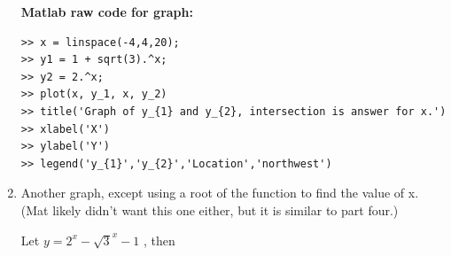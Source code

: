 \documentclass[12pt]{article}
\begin{document}
\begin{enumerate}[label=\textbf{\arabic*}.]
\begin{minipage}{.3\linewidth}
\end{minipage}

\textbf{Matlab raw code for graph:}
\begin{verbatim}
>> x = linspace(-4,4,20);
>> y1 = 1 + sqrt(3).^x;
>> y2 = 2.^x;
>> plot(x, y_1, x, y_2)
>> title('Graph of y_{1} and y_{2}, intersection is answer for x.')
>> xlabel('X')
>> ylabel('Y')
>> legend('y_{1}','y_{2}','Location','northwest')
\end{verbatim}


\newpage

\item Another graph, except using a root of the function to find the value of x. (Mat likely didn't want this one either, but it is similar to part four.)

Let $y = 2^{x} - \sqrt{3}^x - 1$ , then 


\end{enumerate}
\end{document}

